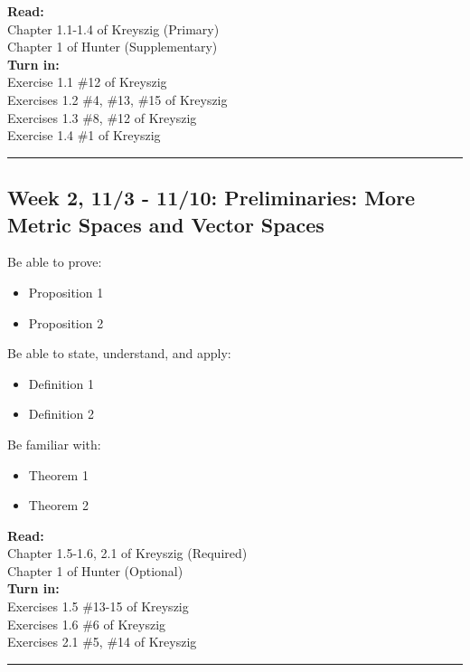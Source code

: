 \documentclass[course=Introduction\ to\ Functional\ Analysis, semester=Fall\ 2021]{syllabustemplate}
\begin{document}
{\textbf{Read:}\\
Chapter 1.1-1.4 of Kreyszig (Primary)\\
Chapter 1 of Hunter (Supplementary)\\

\textbf{Turn in:}\\
Exercise 1.1 \#12 of Kreyszig\\
Exercises 1.2 \#4, \#13, \#15 of Kreyszig\\
Exercises 1.3 \#8, \#12 of Kreyszig\\
Exercise 1.4 \#1 of Kreyszig\\
\hrule
\subsection{Week 2, 11/3 - 11/10: Preliminaries: More Metric Spaces and Vector Spaces}
\label{sub:week_2_11_3_11_10_preliminaries_more_metric_spaces_and_vector_spaces}


Be able to prove:
\begin{itemize}
	\item Proposition 1
	\item Proposition 2
\end{itemize}

Be able to state, understand, and apply:
\begin{itemize}
	\item Definition 1
	\item Definition 2
\end{itemize}

Be familiar with:
\begin{itemize}
	\item Theorem 1
	\item Theorem 2
\end{itemize}
\vspace{1em}

\textbf{Read:}\\
Chapter 1.5-1.6, 2.1 of Kreyszig (Required)\\
Chapter 1 of Hunter (Optional)\\

\textbf{Turn in:}\\
Exercises 1.5 \#13-15 of Kreyszig\\
Exercises 1.6 \#6 of Kreyszig\\
Exercises 2.1 \#5, \#14 of Kreyszig\\
\hrule
}


\end{document}

